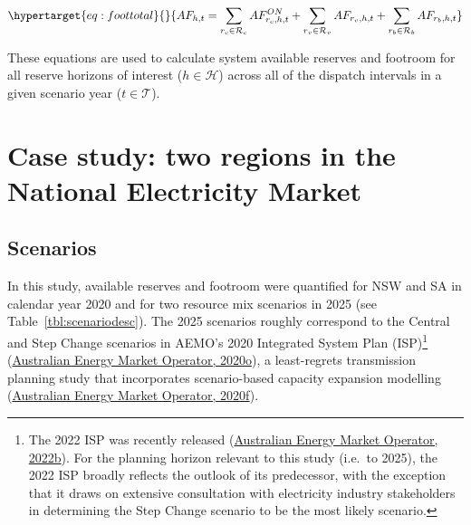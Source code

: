 \documentclass[12pt,a4paper,]{report}
\begin{document}
\begin{equation}\protect\hypertarget{eq:foottotal}{}{ AF_{h,t}=\sum_{r_c \in \mathcal{R}_c}{AF_{r_c,h,t}^{ON}} + \sum_{r_v \in \mathcal{R}_v}{AF_{r_v,h,t}} + \sum_{r_b \in \mathcal{R}_b}{AF_{r_b,h,t}} }\label{eq:foottotal}\end{equation}

These equations are used to calculate system available reserves and
footroom for all reserve horizons of interest (\(h \in \mathcal{H}\))
across all of the dispatch intervals in a given scenario year
(\(t \in \mathcal{T}\)).

\hypertarget{sec:reserves-casestudy}{%
\section{Case study: two regions in the National Electricity
Market}\label{sec:reserves-casestudy}}

\hypertarget{scenarios}{%
\subsection{Scenarios}\label{scenarios}}

In this study, available reserves and footroom were quantified for NSW
and SA in calendar year 2020 and for two resource mix scenarios in 2025
(see Table~\ref{tbl:scenariodesc}). The 2025 scenarios roughly
correspond to the Central and Step Change scenarios in AEMO's 2020
Integrated System Plan (ISP)\footnote{The 2022 ISP was recently released
  (\protect\hyperlink{ref-australianenergymarketoperator2022IntegratedSystem2022}{Australian
  Energy Market Operator, 2022b}). For the planning horizon relevant to
  this study (i.e.~to 2025), the 2022 ISP broadly reflects the outlook
  of its predecessor, with the exception that it draws on extensive
  consultation with electricity industry stakeholders in determining the
  Step Change scenario to be the most likely scenario.}
(\protect\hyperlink{ref-australianenergymarketoperator2020ISPGeneration2020}{Australian
Energy Market Operator, 2020o}), a least-regrets transmission planning
study that incorporates scenario-based capacity expansion modelling
(\protect\hyperlink{ref-australianenergymarketoperator2020IntegratedSystem2020}{Australian
Energy Market Operator, 2020f}).
\end{document}
